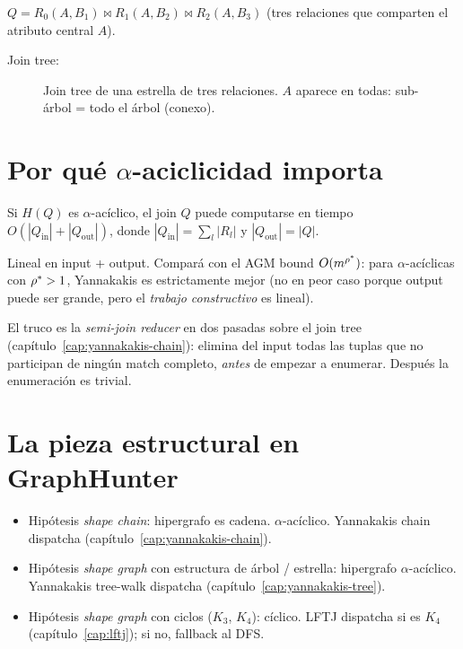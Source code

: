 \begin{ejemplo}
\(Q = R_0(A, B_1) \bowtie R_1(A, B_2) \bowtie R_2(A, B_3)\) (tres
relaciones que comparten el atributo central \(A\)).

Join tree:
\begin{figure}[H]
\centering
{}
\caption{Join tree de una estrella de tres relaciones. \(A\) aparece
en todas: sub-árbol = todo el árbol (conexo).}
\end{figure}
\end{ejemplo}

\section{Por qué \(\alpha\)-aciclicidad importa}

\begin{theorem}[Yannakakis 1981]
Si \(H(Q)\) es \(\alpha\)-acíclico, el join \(Q\) puede computarse
en tiempo \(O(|Q_{\mathrm{in}}| + |Q_{\mathrm{out}}|)\), donde
\(|Q_{\mathrm{in}}| = \sum_l |R_l|\) y \(|Q_{\mathrm{out}}| = |Q|\).
\end{theorem}

\noindent
Lineal en input + output. Compará con el AGM bound
\(O(m^{\rho^{*}})\): para \(\alpha\)-acíclicas con
\(\rho^{*} > 1\), Yannakakis es estrictamente mejor (no en peor caso
porque output puede ser grande, pero el \emph{trabajo
constructivo} es lineal).

El truco es la \emph{semi-join reducer} en dos pasadas sobre el
join tree (capítulo~\ref{cap:yannakakis-chain}): elimina del input
todas las tuplas que no participan de ningún match completo,
\emph{antes} de empezar a enumerar. Después la enumeración es
trivial.

\section{La pieza estructural en GraphHunter}

\begin{itemize}
    \item Hipótesis \emph{shape chain}: hipergrafo es cadena.
    \(\alpha\)-acíclico. Yannakakis chain dispatcha
    (capítulo~\ref{cap:yannakakis-chain}).
    \item Hipótesis \emph{shape graph} con estructura de árbol /
    estrella: hipergrafo \(\alpha\)-acíclico. Yannakakis tree-walk
    dispatcha (capítulo~\ref{cap:yannakakis-tree}).
    \item Hipótesis \emph{shape graph} con ciclos (\(K_3\), \(K_4\)):
    cíclico. LFTJ dispatcha si es \(K_4\)
    (capítulo~\ref{cap:lftj}); si no, fallback al DFS.
\end{itemize}

